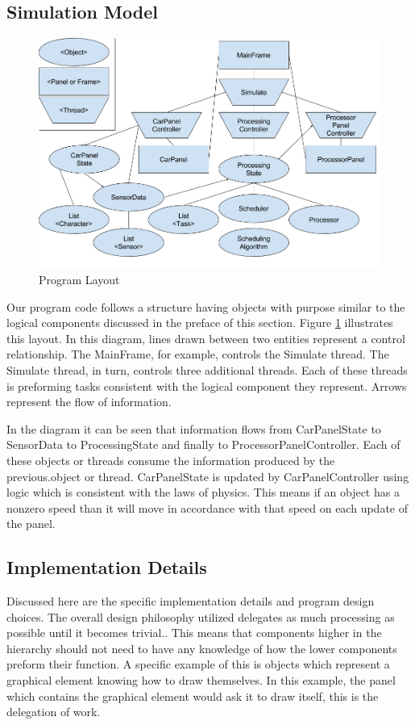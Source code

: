 \documentclass{article} %
\begin{document}
\subsection{Simulation Model}
\begin{figure}[!hbt]
\begin{center}
\includegraphics[width=.4\textwidth,keepaspectratio]{code_layout.png}
\end{center}
\caption{Program Layout}
\label{FIG-DIAGRAM}
\end{figure}

Our program code follows a structure having objects with purpose similar to the logical components discussed in the preface of this section.
Figure \ref{FIG-DIAGRAM} illustrates this layout.
In this diagram, lines drawn between two entities represent a control relationship. The MainFrame, for example, controls the Simulate thread.
The Simulate thread, in turn, controls three additional threads. Each of these threads is preforming tasks consistent with the logical component they represent.
Arrows represent the flow of information.

In the diagram it can be seen that information flows from CarPanelState to SensorData to ProcessingState and finally to ProcessorPanelController.
Each of these objects or threads consume the information produced by the previous.object or thread.
CarPanelState is updated by CarPanelController using logic which is consistent with the laws of physics.
This means if an object has a nonzero speed than it will move in accordance with that speed on each update of the panel.

\subsection{Implementation Details}
Discussed here are the specific implementation details and program design choices.
The overall design philosophy utilized delegates as much processing as possible until it becomes trivial..
This means that components higher in the hierarchy should not need to have any knowledge of how the lower components preform their function.
A specific example of this is objects which represent a graphical element knowing how to draw themselves. In this example, the panel which contains the graphical element would ask it to draw itself, this is the delegation of work. 
\end{document}
